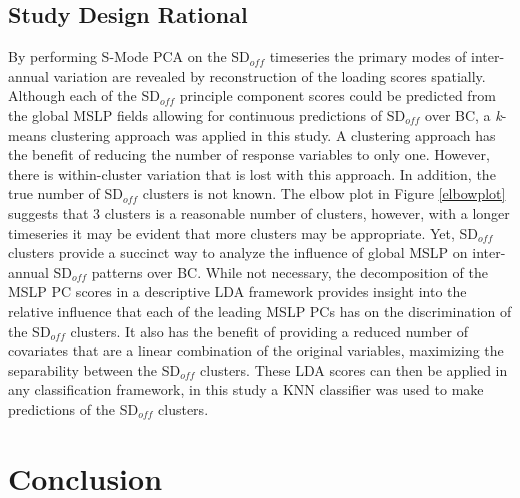 \documentclass{tATO2e}
\newcommand{\sdoff}{SD$_{off}$}
\begin{document}
\subsection{Study Design Rational}
By performing S-Mode PCA on the \sdoff{} timeseries the primary modes of inter-annual variation are revealed by reconstruction of the loading scores spatially. Although each of the \sdoff{} principle component scores could be predicted from the global MSLP fields allowing for continuous predictions of \sdoff{} over BC, a \textit{k}-means clustering approach was applied in this study. A clustering approach has the benefit of reducing the number of response variables to only one. However, there is within-cluster variation that is lost with this approach. In addition, the true number of \sdoff{} clusters is not known. The elbow plot in Figure \ref{elbowplot} suggests that 3 clusters is a reasonable number of clusters, however, with a longer timeseries it may be evident that more clusters may be appropriate. Yet, \sdoff{} clusters provide a succinct way to analyze the influence of global MSLP on inter-annual \sdoff{} patterns over BC. While not necessary, the decomposition of the MSLP PC scores in a descriptive LDA framework provides insight into the relative influence that each of the leading MSLP PCs has on the discrimination of the \sdoff{} clusters. It also has the benefit of providing a reduced number of covariates that are a linear combination of the original variables, maximizing the separability between the \sdoff{} clusters. These LDA scores can then be applied in any classification framework, in this study a KNN classifier was used to make predictions of the \sdoff{} clusters.


\section{Conclusion}
\end{document}
